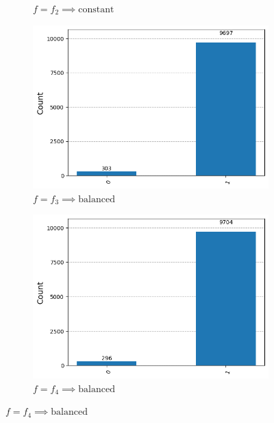 \documentclass[12pt, oneside]{book}
\theoremstyle{definition}
\theoremstyle{definition}
\theoremstyle{remark}
\begin{document}
\begin{enumerate}
\begin{figure}[H]
\begin{subfigure}[b]{0.45\linewidth}
        \caption{$f=f_2\implies \text{constant}$}
        \label{fig:deutsch_result_f2}
        \end{subfigure}
        \vspace{0.5 cm}
        \begin{subfigure}[b]{0.45\linewidth}
        \centering
        \includegraphics[width=1\linewidth]{../images/deutsch_result_f3.png}
        \caption{$f=f_3\implies \text{balanced}$}
        \label{fig:deutsch_result_f3}
        \end{subfigure}
        \hfill
        \begin{subfigure}[b]{0.45\textwidth}
        \centering
        \includegraphics[width=1\linewidth]{../images/deutsch_result_f4.png}
        \caption{$f=f_4\implies \text{balanced}$}
        \label{fig:deutsch_result_f4}
        \end{subfigure}    

\end{figure}
\end{enumerate}
\end{document}
